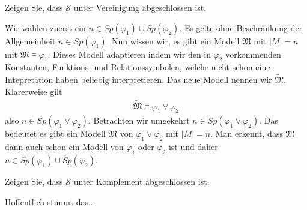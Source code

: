 \begin{exercise}[73]

\phantom{}
	Zeigen Sie, dass $\mathscr{S}$ unter Vereinigung abgeschlossen ist.

\end{exercise}


\begin{solution}

\phantom{}
	Wir wählen zuerst ein $n \in Sp(\varphi_1) \cup Sp(\varphi_2)$. Es gelte ohne Beschränkung der Allgemeinheit $n \in Sp(\varphi_1)$. Nun wissen wir, es gibt ein Modell $\mathfrak{M}$ mit $|M| = n$ mit $\mathfrak{M} \vDash \varphi_1$. Dieses Modell adaptieren indem wir den in $\varphi_2$ vorkommenden Konstanten, Funktions- und Relationssymbolen, welche nicht schon eine Intepretation haben beliebig interpretieren. Das neue Modell nennen wir $\tilde{\mathfrak{M}}$. Klarerweise gilt 
	\begin{align*}
		\tilde{\mathfrak{M}} \vDash \varphi_1 \lor \varphi_2
	\end{align*}
	also $n \in Sp(\varphi_1 \lor \varphi_2)$. \newline
	Betrachten wir umgekehrt $n \in Sp(\varphi_1 \lor \varphi_2)$. Das bedeutet es gibt ein Modell $\mathfrak{M}$ von $\varphi_1 \lor \varphi_2$ mit $|M| = n$. Man erkennt, dass $\mathfrak{M}$ dann auch schon ein Modell von $\varphi_1$ oder $\varphi_2$ ist und daher $n \in Sp(\varphi_1) \cup Sp(\varphi_2)$.  
\end{solution}

\begin{exercise}[74]

\phantom{}
	Zeigen Sie, dass $\mathscr{S}$ unter Komplement abgeschlossen ist.

\end{exercise}


\begin{solution}

\phantom{}
	Hoffentlich stimmt das...

\end{solution}
